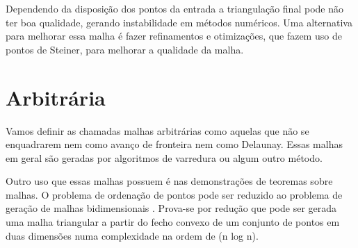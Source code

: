  Dependendo da disposição dos pontos da entrada a triangulação final pode não ter boa qualidade, gerando instabilidade em métodos numéricos. Uma alternativa para melhorar essa malha é fazer refinamentos e otimizações, que fazem uso de pontos de Steiner, para melhorar a qualidade da malha.

\section{Arbitrária}

Vamos definir as chamadas malhas arbitrárias como aquelas que não se enquadrarem nem como avanço de fronteira nem como Delaunay. Essas malhas em geral são geradas por algoritmos de varredura ou algum outro método. 

Outro uso que essas malhas possuem é nas demonstrações de teoremas sobre malhas. O problema de ordenação de pontos pode ser reduzido ao problema de geração de malhas bidimensionais \cite{bib:CarvalhoFigueiredo91}. Prova-se por redução que pode ser gerada uma malha triangular a partir do fecho convexo de um conjunto de pontos em duas dimensões numa complexidade na ordem de (n log n).
